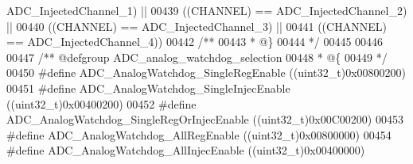 \begin{DoxyCode}
      ADC_InjectedChannel_1\textcolor{preprocessor}{)} \textcolor{preprocessor}{||}
00439                                           \textcolor{preprocessor}{(}\textcolor{preprocessor}{(}\textcolor{preprocessor}{CHANNEL}\textcolor{preprocessor}{)} \textcolor{preprocessor}{==} 
      ADC_InjectedChannel_2\textcolor{preprocessor}{)} \textcolor{preprocessor}{||}
00440                                           \textcolor{preprocessor}{(}\textcolor{preprocessor}{(}\textcolor{preprocessor}{CHANNEL}\textcolor{preprocessor}{)} \textcolor{preprocessor}{==} 
      ADC_InjectedChannel_3\textcolor{preprocessor}{)} \textcolor{preprocessor}{||}
00441                                           \textcolor{preprocessor}{(}\textcolor{preprocessor}{(}\textcolor{preprocessor}{CHANNEL}\textcolor{preprocessor}{)} \textcolor{preprocessor}{==} 
      ADC_InjectedChannel_4\textcolor{preprocessor}{)}\textcolor{preprocessor}{)}
00442 \textcolor{comment}{/**}
00443 \textcolor{comment}{  * @\}}
00444 \textcolor{comment}{  */}
00445 
00446 
00447 \textcolor{comment}{/** @defgroup ADC\_analog\_watchdog\_selection }
00448 \textcolor{comment}{  * @\{}
00449 \textcolor{comment}{  */}
00450 \textcolor{preprocessor}{#}\textcolor{preprocessor}{define} \textcolor{preprocessor}{ADC\_AnalogWatchdog\_SingleRegEnable}         \textcolor{preprocessor}{(}\textcolor{preprocessor}{(}\textcolor{preprocessor}{uint32\_t}\textcolor{preprocessor}{)}0x00800200\textcolor{preprocessor}{)}
00451 \textcolor{preprocessor}{#}\textcolor{preprocessor}{define} \textcolor{preprocessor}{ADC\_AnalogWatchdog\_SingleInjecEnable}       \textcolor{preprocessor}{(}\textcolor{preprocessor}{(}\textcolor{preprocessor}{uint32\_t}\textcolor{preprocessor}{)}0x00400200\textcolor{preprocessor}{)}
00452 \textcolor{preprocessor}{#}\textcolor{preprocessor}{define} \textcolor{preprocessor}{ADC\_AnalogWatchdog\_SingleRegOrInjecEnable}  \textcolor{preprocessor}{(}\textcolor{preprocessor}{(}\textcolor{preprocessor}{uint32\_t}\textcolor{preprocessor}{)}0x00C00200\textcolor{preprocessor}{)}
00453 \textcolor{preprocessor}{#}\textcolor{preprocessor}{define} \textcolor{preprocessor}{ADC\_AnalogWatchdog\_AllRegEnable}            \textcolor{preprocessor}{(}\textcolor{preprocessor}{(}\textcolor{preprocessor}{uint32\_t}\textcolor{preprocessor}{)}0x00800000\textcolor{preprocessor}{)}
00454 \textcolor{preprocessor}{#}\textcolor{preprocessor}{define} \textcolor{preprocessor}{ADC\_AnalogWatchdog\_AllInjecEnable}          \textcolor{preprocessor}{(}\textcolor{preprocessor}{(}\textcolor{preprocessor}{uint32\_t}\textcolor{preprocessor}{)}0x00400000\textcolor{preprocessor}{)}

\end{DoxyCode}
